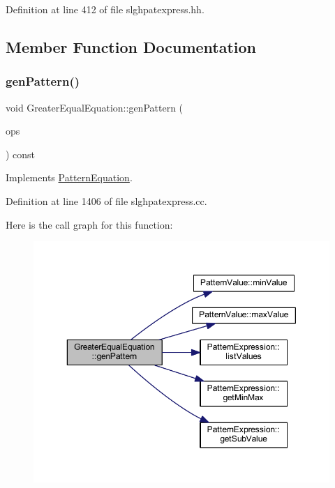 Definition at line 412 of file slghpatexpress.\+hh.



\subsection{Member Function Documentation}
\mbox{\label{class_greater_equal_equation_ac3b38fb035abd2547debc594396bf5f6}} 
\subsubsection{\texorpdfstring{genPattern()}{genPattern()}}
{\footnotesize\ttfamily void Greater\+Equal\+Equation\+::gen\+Pattern (\begin{DoxyParamCaption}\item[{const vector$<$ \mbox{\hyperlink{class_token_pattern}{Token\+Pattern}} $>$ \&}]{ops }\end{DoxyParamCaption}) const\hspace{0.3cm}{\ttfamily [virtual]}}



Implements \mbox{\hyperlink{class_pattern_equation_a9838e5bfe5b6013c99567628a6364bfd}{Pattern\+Equation}}.



Definition at line 1406 of file slghpatexpress.\+cc.

Here is the call graph for this function\+:
\nopagebreak
\begin{figure}[H]
\begin{center}
\leavevmode
\includegraphics[width=350pt]{class_greater_equal_equation_ac3b38fb035abd2547debc594396bf5f6_cgraph}
\end{center}
\end{figure}


